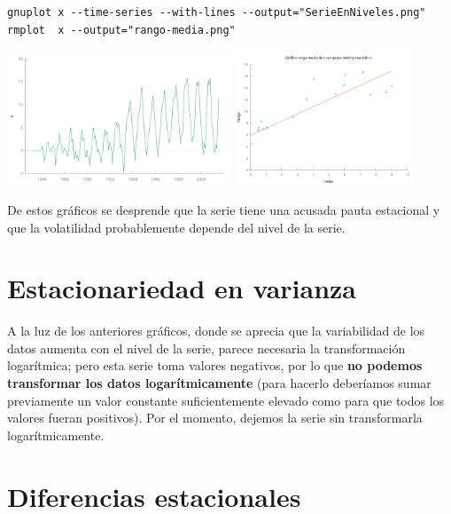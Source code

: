 \documentclass[10pt]{article}
\begin{document}
\begin{verbatim}
gnuplot x --time-series --with-lines --output="SerieEnNiveles.png"
rmplot  x --output="rango-media.png"
\end{verbatim}

\begin{center}
\includegraphics[width=0.5\textwidth]{./SegundoEjercicioIdentificacionARIMA/SerieEnNiveles.png}
\includegraphics[width=0.4\textwidth]{./SegundoEjercicioIdentificacionARIMA/rango-media.png} 
\end{center}

De estos gráficos se desprende que la serie tiene una acusada pauta
estacional y que la volatilidad probablemente depende del nivel de la
serie.
\section*{Estacionariedad en varianza}
\label{sec:orgec107d1}

A la luz de los anteriores gráficos, donde se aprecia que la
variabilidad de los datos aumenta con el nivel de la serie, parece
necesaria la transformación logarítmica; pero esta serie toma valores
negativos, por lo que \textbf{no podemos transformar los datos
logarítmicamente} (para hacerlo deberíamos sumar previamente un valor
constante suficientemente elevado como para que todos los valores
fueran positivos). Por el momento, dejemos la serie sin transformarla
logarítmicamente.
\section*{Diferencias estacionales}
\label{sec:orgf027ddb}
\end{document}
